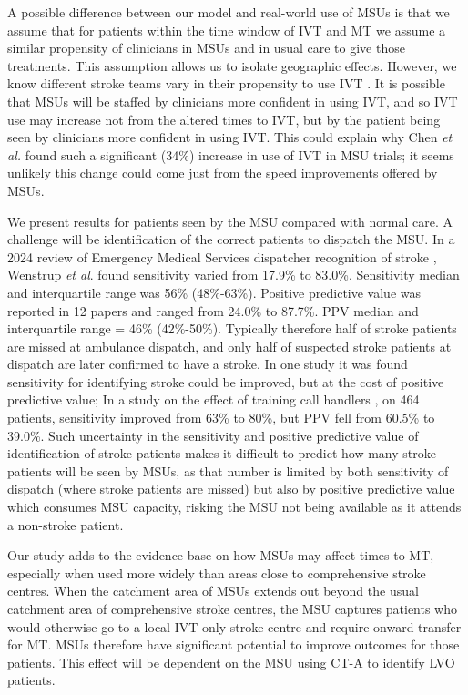 A possible difference between our model and real-world use of MSUs is that we assume that for patients within the time window of IVT and MT we assume a similar propensity of clinicians in MSUs and in usual care to give those treatments. This assumption allows us to isolate geographic effects. However, we know different stroke teams vary in their propensity to use IVT \cite{pearn_what_2023}. It is possible that MSUs will be staffed by clinicians more confident in using IVT, and so IVT use may increase not from the altered times to IVT, but by the patient being seen by clinicians more confident in using IVT. This could explain why Chen \textit{et al.} \cite{chen_systematic_2022} found such a significant (34\%) increase in use of IVT in MSU trials; it seems unlikely this change could come just from the speed improvements offered by MSUs.

We present results for patients seen by the MSU compared with normal care. A challenge will be identification of the correct patients to dispatch the MSU. In a 2024 review of Emergency Medical Services dispatcher recognition of stroke \cite{wenstrup_emergency_2024}, Wenstrup \textit{et al}. found sensitivity varied from 17.9\% to 83.0\%. Sensitivity median and interquartile range was 56\% (48\%-63\%). Positive predictive value was reported in 12 papers and ranged from 24.0\% to 87.7\%. PPV median and interquartile range = 46\% (42\%-50\%). Typically therefore half of stroke patients are missed at ambulance dispatch, and only half of suspected stroke patients at dispatch are later confirmed to have a stroke. In one study it was found sensitivity for identifying stroke could be improved, but at the cost of positive predictive value; In a study on the effect of training call handlers \cite{watkins_training_2013}, on 464 patients, sensitivity improved from 63\% to 80\%, but PPV fell from 60.5\% to 39.0\%. Such uncertainty in the sensitivity and positive predictive value of identification of stroke patients makes it difficult to predict how many stroke patients will be seen by MSUs, as that number is limited by both sensitivity of dispatch (where stroke patients are missed) but also by positive predictive value which consumes MSU capacity, risking the MSU not being available as it attends a non-stroke patient.

Our study adds to the evidence base on how MSUs may affect times to MT, especially when used more widely than areas close to comprehensive stroke centres. When the catchment area of MSUs extends out beyond the usual catchment area of comprehensive stroke centres, the MSU captures patients who would otherwise go to a local IVT-only stroke centre and require onward transfer for MT. MSUs therefore have significant potential to improve outcomes for those patients. This effect will be dependent on the MSU using CT-A to identify LVO patients.

